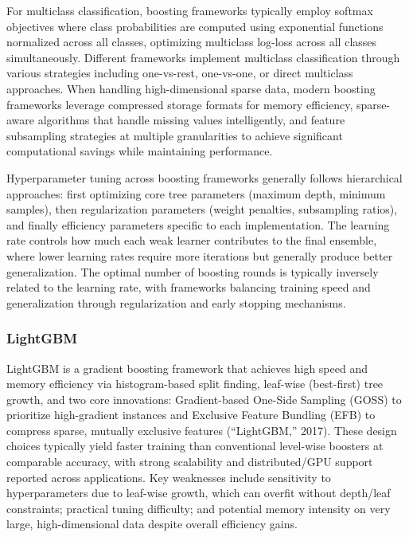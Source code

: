 \documentclass[
  titlepage]{article}
\begin{document}
For multiclass classification, boosting frameworks typically employ
softmax objectives where class probabilities are computed using
exponential functions normalized across all classes, optimizing
multiclass log-loss across all classes simultaneously. Different
frameworks implement multiclass classification through various
strategies including one-vs-rest, one-vs-one, or direct multiclass
approaches. When handling high-dimensional sparse data, modern boosting
frameworks leverage compressed storage formats for memory efficiency,
sparse-aware algorithms that handle missing values intelligently, and
feature subsampling strategies at multiple granularities to achieve
significant computational savings while maintaining performance.

Hyperparameter tuning across boosting frameworks generally follows
hierarchical approaches: first optimizing core tree parameters (maximum
depth, minimum samples), then regularization parameters (weight
penalties, subsampling ratios), and finally efficiency parameters
specific to each implementation. The learning rate controls how much
each weak learner contributes to the final ensemble, where lower
learning rates require more iterations but generally produce better
generalization. The optimal number of boosting rounds is typically
inversely related to the learning rate, with frameworks balancing
training speed and generalization through regularization and early
stopping mechanisms.

\subsubsection{LightGBM}\label{lightgbm}

LightGBM is a gradient boosting framework that achieves high speed and
memory efficiency via histogram-based split finding, leaf-wise
(best-first) tree growth, and two core innovations: Gradient-based
One-Side Sampling (GOSS) to prioritize high-gradient instances and
Exclusive Feature Bundling (EFB) to compress sparse, mutually exclusive
features ({``LightGBM,''} 2017). These design choices typically yield
faster training than conventional level-wise boosters at comparable
accuracy, with strong scalability and distributed/GPU support reported
across applications. Key weaknesses include sensitivity to
hyperparameters due to leaf-wise growth, which can overfit without
depth/leaf constraints; practical tuning difficulty; and potential
memory intensity on very large, high-dimensional data despite overall
efficiency gains.
\end{document}

